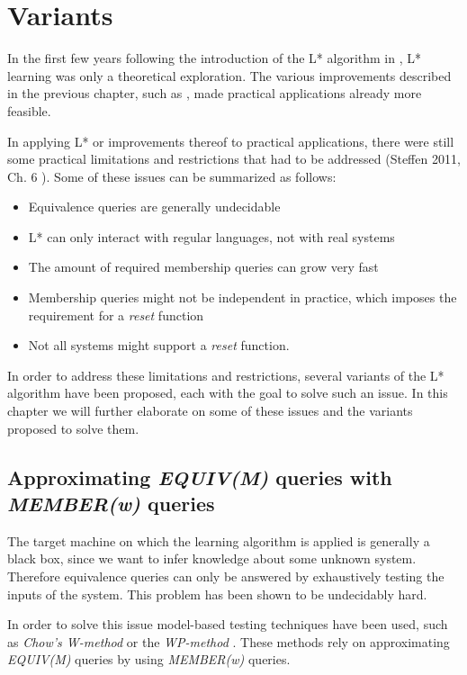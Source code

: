 \documentclass[multi,crop=false,class=article]{standalone}
\begin{document}
\section{Variants}
\label{sec:variants}
In the first few years following the introduction of the L* algorithm in
\cite{Angluin87}, L* learning was only a theoretical exploration.
The various improvements described in the previous chapter,
such as ,
made practical applications already more feasible.

In applying L* or improvements thereof to practical applications,
there were still some practical limitations and restrictions that had to
be addressed (Steffen 2011, Ch. 6 \cite{Steffen11}).
Some of these issues can be summarized as follows:
\begin{itemize}
  \item Equivalence queries are generally undecidable
  \item L* can only interact with regular languages, not with real systems
  \item The amount of required membership queries can grow very fast
  \item Membership queries might not be independent in practice,
        which imposes the requirement for a \textit{reset} function
  \item Not all systems might support a \textit{reset} function.
\end{itemize}

In order to address these limitations and restrictions,
several variants of the L* algorithm have been proposed,
each with the goal to solve such an issue.
In this chapter we will further elaborate on some of these issues
and the variants proposed to solve them.

\subsection{Approximating \textit{EQUIV(M)} queries with \textit{MEMBER(w)} queries}
The target machine on which the learning algorithm is applied is generally
a black box, since we want to infer knowledge about some unknown system.
Therefore equivalence queries can only be answered by exhaustively testing
the inputs of the system. This problem has been shown to be undecidably hard.

In order to solve this issue model-based testing techniques have been used,
such as \textit{Chow's W-method} or the \textit{WP-method} .
These methods rely on approximating \textit{EQUIV(M)} queries by using
\textit{MEMBER(w)} queries.
\end{document}
